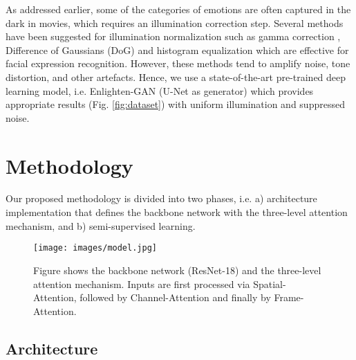 \documentclass[runningheads]{llncs}
\begin{document}
As addressed earlier, some of the categories of emotions are often captured in the dark in movies, which requires an illumination correction step. Several methods have been suggested for illumination normalization such as gamma correction \cite{anila2012preprocessing,liu2017facial}, Difference of Gaussians (DoG) \cite{wang2012improved} and histogram equalization \cite{bendjillali2019improved,karthigayan2007development} which are effective for facial expression recognition. However, these methods tend to amplify noise, tone distortion, and other artefacts. Hence, we use a state-of-the-art pre-trained deep learning model, i.e. Enlighten-GAN \cite{jiang2019enlightengan} (U-Net \cite{ronneberger2015u} as generator) which provides appropriate results (Fig. \ref{fig:dataset}) with uniform illumination and suppressed noise.

\section{Methodology}
Our proposed methodology is divided into two phases, i.e. a) architecture implementation that defines the backbone network with the three-level attention mechanism, and b) semi-supervised learning.

\begin{figure}[t!]
\centering
\texttt{[image: images/model.jpg]}
\caption{Figure shows the backbone network (ResNet-18) and the three-level attention mechanism. Inputs are first processed via Spatial-Attention, followed by Channel-Attention and finally by Frame-Attention.}
\label{fig:model}
\end{figure}


\subsection{Architecture}
\end{document}
